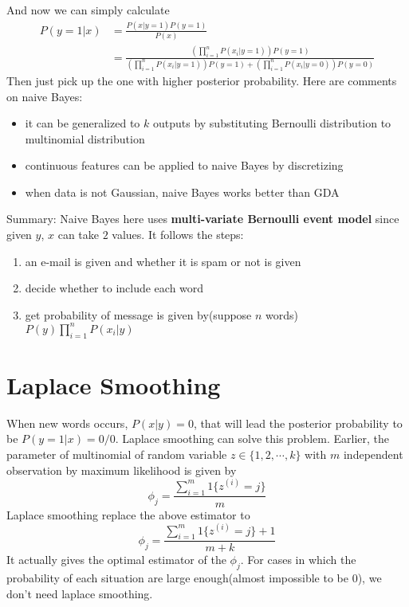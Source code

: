 \documentclass[10pt,a4paper,oneside]{article}
\begin{document}
And now we can simply calculate
\begin{align*}
P(y=1| x) &= \frac{P(x|y=1)P(y=1)}{P(x)}\\
&= \frac{(\prod_{i=1}^{n} P(x_i|y=1))P(y=1)}{(\prod_{i=1}^{n} P(x_i|y=1))P(y=1)+(\prod_{i=1}^{n} P(x_i|y=0))P(y=0)}
\end{align*}
Then just pick up the one with higher posterior probability. Here are comments on naive Bayes:
\begin{itemize}
	\item  it can be generalized to $k$ outputs by substituting Bernoulli distribution to multinomial distribution
	\item continuous features can be applied to naive Bayes by discretizing 
	\item when data is not Gaussian, naive Bayes works better than GDA
\end{itemize}
Summary: Naive Bayes here uses \textbf{multi-variate Bernoulli event model} since given $y$, $x$ can take $2$ values. It follows the steps:
\begin{enumerate}
	\item an e-mail is given and whether it is spam or not is given
	\item decide whether to include each word
	\item get probability of message is given by(suppose $n$ words) $P(y)\prod_{i=1}^{n} P(x_i|y)$
\end{enumerate}

\section{Laplace Smoothing}
When new words occurs, $P(x|y)=0$, that will lead the posterior probability to be $P(y=1|x)=0/0$. Laplace smoothing can solve this problem. Earlier, the parameter of multinomial of random variable $z\in\{1,2, \cdots, k\}$ with $m$ independent observation by maximum likelihood is given by
\[
\phi_j = \frac{\sum_{i=1}^{m} 1 \{z^{(i)} = j\}}{m}
\]
Laplace smoothing replace the above estimator to
\[
\phi_j = \frac{\sum_{i=1}^{m} 1 \{z^{(i)} = j\} + 1}{m+k}
\]
It actually gives the optimal estimator of the $\phi_j$. For cases in which the probability of each situation are large enough(almost impossible to be $0$), we don't need laplace smoothing.
\end{document}
